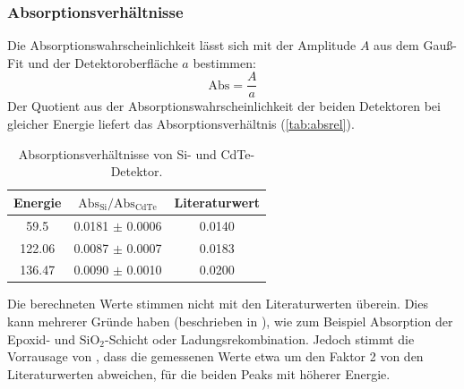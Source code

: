 \subsubsection{Absorptionsverhältnisse}
Die Absorptionswahrscheinlichkeit lässt sich mit der Amplitude $A$ aus dem Gauß-Fit und der Detektoroberfläche $a$ bestimmen: 
\begin{equation}
  \text{Abs} = \frac{A}{a}
\end{equation}
Der Quotient aus der Absorptionswahrscheinlichkeit der beiden Detektoren bei gleicher Energie liefert das Absorptionsverhältnis 
(\autoref{tab:absrel}).
\begin{table}[H]
\begin{center}
\begin{tabular}{|c|c|c|}
\hline 
Energie & $\text{Abs}_{\text{Si}} / \text{Abs}_{\text{CdTe}}$ & Literaturwert \cite{staatsex} \\ \hline
59.5 & 0.0181    $\pm$ 0.0006 & 0.0140 \\ \hline
122.06 & 0.0087 $\pm$ 0.0007 & 0.0183 \\ \hline
136.47 & 0.0090 $\pm$ 0.0010 & 0.0200 \\ \hline
\end{tabular}
\caption{Absorptionsverhältnisse von Si- und CdTe-Detektor.}
\label{tab:absrel}
\end{center}
\end{table}
Die berechneten Werte stimmen nicht mit den Literaturwerten \cite{staatsex} überein. Dies kann mehrerer Gründe haben 
(beschrieben in \cite{staatsex}), wie zum Beispiel Absorption der Epoxid- und $\text{SiO}_2$-Schicht oder Ladungsrekombination. Jedoch 
stimmt die Vorrausage von \cite{staatsex}, dass die gemessenen Werte etwa um den Faktor 2 von den Literaturwerten abweichen, für die beiden Peaks 
mit höherer Energie.